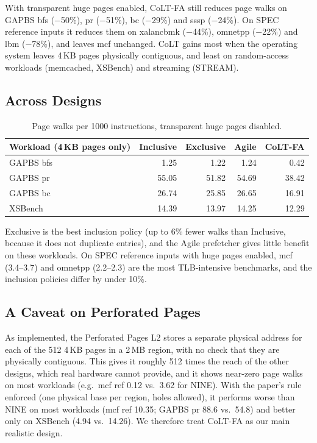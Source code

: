 \documentclass[11pt]{article}
\begin{document}
\noindent With transparent huge pages enabled, CoLT-FA still reduces page walks on GAPBS bfs ($-$50\%), pr ($-$51\%), bc ($-$29\%) and sssp ($-$24\%). On SPEC reference inputs it reduces them on xalancbmk ($-$44\%), omnetpp ($-$22\%) and lbm ($-$78\%), and leaves mcf unchanged. CoLT gains most when the operating system leaves 4\,KB pages physically contiguous, and least on random-access workloads (memcached, XSBench) and streaming (STREAM).

\subsection{Across Designs}
\begin{table}[H]
\centering
\begin{tabularx}{\textwidth}{@{}L R R R R@{}}
\toprule
\textbf{Workload (4\,KB pages only)} & \textbf{Inclusive} & \textbf{Exclusive} & \textbf{Agile} & \textbf{CoLT-FA} \\
\midrule
GAPBS bfs & 1.25 & 1.22 & 1.24 & 0.42 \\
GAPBS pr & 55.05 & 51.82 & 54.69 & 38.42 \\
GAPBS bc & 26.74 & 25.85 & 26.65 & 16.91 \\
XSBench & 14.39 & 13.97 & 14.25 & 12.29 \\
\bottomrule
\end{tabularx}
\caption{Page walks per 1000 instructions, transparent huge pages disabled.}
\end{table}

\noindent Exclusive is the best inclusion policy (up to 6\% fewer walks than Inclusive, because it does not duplicate entries), and the Agile prefetcher gives little benefit on these workloads. On SPEC reference inputs with huge pages enabled, mcf (3.4--3.7) and omnetpp (2.2--2.3) are the most TLB-intensive benchmarks, and the inclusion policies differ by under 10\%.

\subsection{A Caveat on Perforated Pages}
As implemented, the Perforated Pages L2 stores a separate physical address for each of the 512 4\,KB pages in a 2\,MB region, with no check that they are physically contiguous. This gives it roughly 512 times the reach of the other designs, which real hardware cannot provide, and it shows near-zero page walks on most workloads (e.g.\ mcf ref 0.12 vs.\ 3.62 for NINE). With the paper's rule enforced (one physical base per region, holes allowed), it performs worse than NINE on most workloads (mcf ref 10.35; GAPBS pr 88.6 vs.\ 54.8) and better only on XSBench (4.94 vs.\ 14.26). We therefore treat CoLT-FA as our main realistic design.
\end{document}

